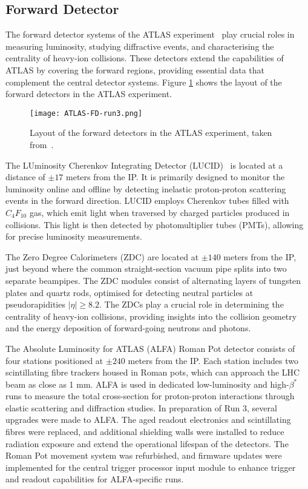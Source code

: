     \subsection{Forward Detector}
        The forward detector systems of the ATLAS experiment~\cite{ATLAS-TDR-18} play crucial roles in measuring luminosity, 
        studying diffractive events, and characterising the centrality of heavy-ion collisions. These 
        detectors extend the capabilities of ATLAS by covering the forward regions, providing essential 
        data that complement the central detector systems. Figure \ref{fig:Forward_detectors} shows the
        layout of the forward detectors in the ATLAS experiment.
        \begin{figure}[htbp]
            \centering
            \texttt{[image: ATLAS-FD-run3.png]}
            \caption{Layout of the forward detectors in the ATLAS experiment, taken from~\cite{GENR-2019-02}.}
            \label{fig:Forward_detectors}
        \end{figure}

        The LUminosity Cherenkov Integrating Detector (LUCID)~\cite{LUCID2} is located at a distance of $\pm17$ meters 
        from the IP. It is primarily designed to monitor the luminosity online and offline by detecting 
        inelastic proton-proton scattering events in the forward direction. LUCID employs Cherenkov tubes 
        filled with $C_4F_{10}$ gas, which emit light when traversed by charged particles produced in 
        collisions. This light is then detected by photomultiplier tubes (PMTs), allowing for precise 
        luminosity measurements.

        The Zero Degree Calorimeters (ZDC) are located at $\pm140$ meters from the IP, just beyond where 
        the common straight-section vacuum pipe splits into two separate beampipes. The ZDC modules 
        consist of alternating layers of tungsten plates and quartz rods, optimised for detecting neutral 
        particles at pseudorapidities \(|\eta| \geq 8.2\). The ZDCs play a crucial role in determining the 
        centrality of heavy-ion collisions, providing insights into the collision geometry and the energy 
        deposition of forward-going neutrons and photons.

        The Absolute Luminosity for ATLAS (ALFA) Roman Pot detector consists of four stations positioned at $\pm240$
        meters from the IP. Each station includes two scintillating fibre trackers housed in Roman pots, 
        which can approach the LHC beam as close as 1 mm. ALFA is used in dedicated low-luminosity and 
        high-\(\beta^*\) runs to measure the total cross-section for proton-proton interactions through 
        elastic scattering and diffraction studies. In preparation of Run 3, 
        several upgrades were made to ALFA. The aged readout electronics and scintillating
        fibres were replaced, and additional shielding walls were installed to reduce radiation exposure
        and extend the operational lifespan of the detectors. The Roman Pot movement system was refurbished,
        and firmware updates were implemented for the central trigger processor input module to enhance 
        trigger and readout capabilities for ALFA-specific runs.

